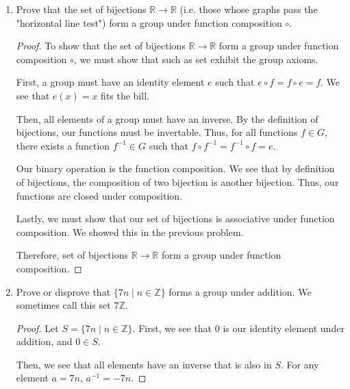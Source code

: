 \documentclass{article}
\begin{document}
\begin{enumerate}
\begin{proof}
            Therefore, function composition must be associative.
        \end{proof}
    
    \item 
        Prove that the set of bijections \(\mathbb{R} \to \mathbb{R}\) (i.e. 
        those whose graphs pass the "horizontal line test") form a group under 
        function composition \(\circ\).
    
        \begin{proof}
            To show that the set of bijections \(\mathbb{R} \to \mathbb{R}\) form 
            a group under function composition \(\circ\), we must show that such 
            as set exhibit the group axioms. 

            First, a group must have an identity element \(e\) such that 
            \(e \circ f = f \circ e = f\). We see that \(e(x) = x\) fits the bill.

            Then, all elements of a group must have an inverse. By the definition 
            of bijections, our functions must be invertable. Thus, for all 
            functions \(f \in G\), there exists a function \(f^{-1} \in G\) such 
            that \(f \circ f^{-1} = f^{-1} \circ f = e\). 

            Our binary operation is the function composition. We see that by 
            definition of bijections, the composition of two bijection is another 
            bijection. Thus, our functions are closed under composition. 

            Lastly, we must show that our set of bijections is associative under 
            function composition. We showed this in the previous problem.

            Therefore, set of bijections \(\mathbb{R} \to \mathbb{R}\) form a 
            group under function composition.

        \end{proof}

    \item
        Prove or disprove that \(\{7n \mid n \in \mathbb{Z}\}\) forms a group under addition. We sometimes call this set \(7\mathbb{Z}\).
    
        \begin{proof}
            Let \(S = \{7n \mid n \in \mathbb{Z}\} \).
            First, we see that 0 is our identity element under addition, and 
            \(0 \in S\).

            Then, we see that all elements have an inverse that is also in \(S\). 
            For any element \(a = 7n\), \(a^{-1} = -7n\).


\end{proof}
\end{enumerate}
\end{document}
